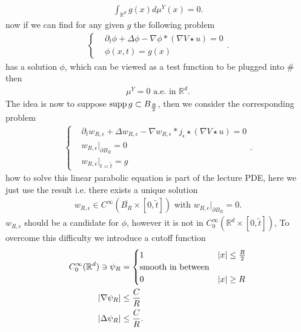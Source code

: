 \begin{align*}
  \int_{\mathbb{R}^{d} }g(x) d\mu^Y(x) = 0
.\end{align*}
now if we can find for any given $g$ the following problem 
\begin{align*}
  \begin{cases}
    &\partial_t \phi  + \Delta  \phi  - \nabla \phi *(\nabla V \star u) = 0\\
    &\phi(x,t) = g(x)
  \end{cases}
.\end{align*}
has a solution $\phi$, which can be viewed as a test function to be plugged into \# then 
\begin{align*}
  \mu ^{Y}  = 0 \text{ a.e. in }  \mathbb{R}^{d} 
.\end{align*}
The idea is now to suppose $\operatorname*{supp} g \subset  B_{\frac{R}{2}}$, then we consider the corresponding problem 
\begin{align*}
  \begin{cases}
    &\partial_t w_{R,\epsilon} + \Delta w_{R,\epsilon} -\nabla w_{R,\epsilon} * j_{\epsilon} \star  (\nabla V \star  u) = 0\\
    &w_{R,\epsilon} \rvert_{\partial B_{R}} =  0\\
    &w_{R,\epsilon} \rvert_{t = \tilde{t} }  = g
  \end{cases}
.\end{align*}
how to solve this linear parabolic equation is part of the lecture PDE, here we just use the result i.e.
there exists a unique solution 
\begin{align*}
  w_{R,\epsilon} \in  C^{\infty}(\overline{B_R} \times  [0,\tilde{t} ] ) \text{ with } w_{R,\epsilon} \rvert_{\partial B_R} = 0
.\end{align*}
$w_{R,\epsilon}$ should be a candidate  for $\phi $, however it is not in $C_0^{\infty}(\mathbb{R}^{d} \times  [0,\tilde{t} ] ) $,
To overcome this difficulty we introduce a cutoff function  
\begin{align*}
  C_0^{\infty}(\mathbb{R}^{d} ) \ni \psi_{R} &=  \begin{cases}
      1 &\lvert x\rvert \le \frac{R}{2}\\
      \text{smooth in between} & \\
      0 &\lvert x\rvert \ge R
    \end{cases}\\
    \lvert\nabla \psi_R\rvert &\le \frac{C}{R} \\
    \lvert\Delta  \psi_R\rvert &\le \frac{C}{R}
.\end{align*}
